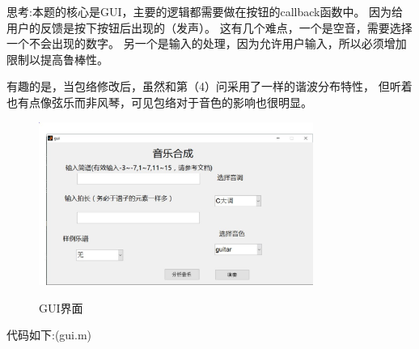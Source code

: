 \documentclass{ctexart}
\begin{document}
        思考:本题的核心是GUI，主要的逻辑都需要做在按钮的callback函数中。
        因为给用户的反馈是按下按钮后出现的（发声）。
        这有几个难点，一个是空音，需要选择一个不会出现的数字。
        另一个是输入的处理，因为允许用户输入，所以必须增加限制以提高鲁棒性。

        有趣的是，当包络修改后，虽然和第（4）问采用了一样的谐波分布特性，
        但听着也有点像弦乐而非风琴，可见包络对于音色的影响也很明显。
        \begin{figure}
            \centering
            \includegraphics[width=0.8\textwidth]{fmt/1_12.jpg}\\
            \caption{GUI界面\label{112}}
        \end{figure}

        代码如下:(gui.m)
        
        
\end{document}
